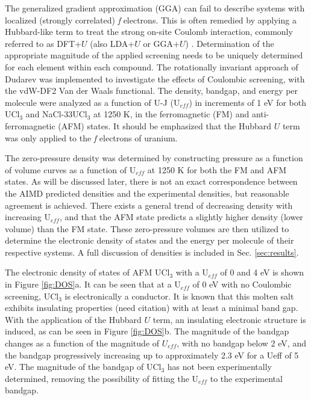 \documentclass[preprint,3p,10pt,onecolumn,number,sort&compress]{elsarticle}
\begin{document}
{The generalized gradient approximation (GGA) can fail to describe systems with localized (strongly correlated) \textit{f} electrons. This is often remedied by applying a Hubbard-like term to treat the strong on-site Coulomb interaction, commonly referred to as DFT+$U$ (also LDA+$U$ or GGA+$U$) \cite{rohrbach2003}. Determination of the appropriate magnitude of the applied screening needs to be uniquely determined for each element within each compound. The rotationally invariant approach of Dudarev \cite{dudarev1998} was implemented to investigate the effects of Coulombic screening, with the vdW-DF2 Van der Waals functional. The density, bandgap, and energy per molecule were analyzed as a function of U-J (U$_{eff}$) in increments of 1 eV for both UCl$_3$ and NaCl-33UCl$_3$ at 1250 K, in the ferromagnetic (FM) and anti-ferromagnetic (AFM) states. It should be emphasized that the Hubbard $U$ term was only applied to the \textit{f} electrons of uranium. 

The zero-pressure density was determined by constructing pressure as a function of volume curves as a function of U$_{eff}$ at 1250 K for both the FM and AFM states. As will be discussed later, there is not an exact correspondence between the AIMD predicted densities and the experimental densities, but reasonable agreement is achieved. There exists a general trend of decreasing density with increasing U$_{eff}$, and that the AFM state predicts a slightly higher density (lower volume) than the FM state. These zero-pressure volumes are then utilized to determine the electronic density of states and the energy per molecule of their respective systems. A full discussion of densities is included in Sec. \ref{sec:results}. 

The electronic density of states of AFM UCl$_3$ with a U$_{eff}$ of 0 and 4 eV is shown in Figure \ref{fig:DOS}a. It can be seen that at a U$_{eff}$ of 0 eV with no Coulombic screening, UCl$_3$ is electronically a conductor. It is known that this molten salt exhibits insulating properties {\color{red}(need citation)} with at least a minimal band gap. With the application of the Hubbard $U$ term, an insulating electronic structure is induced, as can be seen in Figure \ref{fig:DOS}b. The magnitude of the bandgap changes as a function of the magnitude of $U_{eff}$, with no bandgap below 2 eV, and the bandgap progressively increasing up to approximately 2.3 eV for a Ueff of 5 eV. The magnitude of the bandgap of UCl$_3$ has not been experimentally determined, removing the possibility of fitting the U$_{eff}$ to the experimental bandgap. 

}
\end{document}
